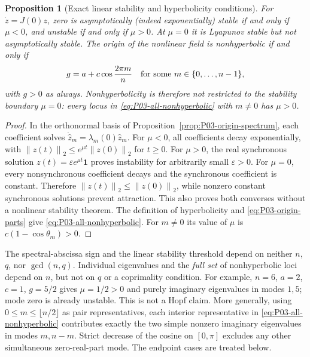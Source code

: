 \documentclass[11pt]{article}
\newcommand{\one}{\mathbf{1}}
\newcommand{\norm}[1]{\left\lVert #1\right\rVert}
\newtheorem{proposition}[theorem]{Proposition}
\theoremstyle{definition}
\theoremstyle{remark}
\begin{document}
\begin{proposition}[Exact linear stability and hyperbolicity conditions]
\label{prop:P03-stability}
For $\dot z=J(0)z$, zero is asymptotically (indeed exponentially)
stable if and only if $\mu<0$, and unstable if and only if $\mu>0$.
At $\mu=0$ it is Lyapunov stable but not asymptotically stable.
The origin of the nonlinear field is nonhyperbolic if and only if
\begin{equation}
 g=a+c\cos\frac{2\pi m}{n}
 \quad\hbox{for some }m\in\{0,\ldots,n-1\},
 \label{eq:P03-all-nonhyperbolic}
\end{equation}
with $g>0$ as always. Nonhyperbolicity is therefore not restricted
to the stability boundary $\mu=0$: every locus in
\eqref{eq:P03-all-nonhyperbolic} with $m\ne0$ has $\mu>0$.
\end{proposition}
\begin{proof}
In the orthonormal basis of Proposition~\ref{prop:P03-origin-spectrum},
each coefficient solves $\dot{\widehat z}_m=\lambda_m(0)\widehat z_m$.
For $\mu<0$, all coefficients decay exponentially, with
$\norm{z(t)}_2\le e^{\mu t}\norm{z(0)}_2$ for $t\ge0$.
For $\mu>0$, the real synchronous solution
$z(t)=\varepsilon e^{\mu t}\one$ proves instability for arbitrarily
small $\varepsilon>0$. For $\mu=0$, every nonsynchronous coefficient
 decays and the synchronous coefficient is constant. Therefore
$\norm{z(t)}_2\le\norm{z(0)}_2$, while nonzero constant synchronous
solutions prevent attraction. This also proves both converses
without a nonlinear stability theorem. The definition of hyperbolicity
and \eqref{eq:P03-origin-parts} give
\eqref{eq:P03-all-nonhyperbolic}. For $m\ne0$ its value of
$\mu$ is $c(1-\cos\theta_m)>0$.
\end{proof}

The spectral-abscissa sign and the linear stability threshold depend
on neither $n$, $q$, nor $\gcd(n,q)$. Individual eigenvalues and the
\emph{full set} of nonhyperbolic loci depend on $n$, but not on $q$
or a coprimality condition. For example, $n=6$, $a=2$, $c=1$,
$g=5/2$ gives $\mu=1/2>0$ and purely imaginary eigenvalues in
modes $1,5$; mode zero is already unstable. This is not a Hopf claim.
More generally, using $0\le m\le\lfloor n/2\rfloor$ as pair
representatives, each interior representative in
\eqref{eq:P03-all-nonhyperbolic} contributes exactly the two
simple nonzero imaginary eigenvalues in modes $m,n-m$.
Strict decrease of the cosine on $[0,\pi]$ excludes any other
simultaneous zero-real-part mode. The endpoint cases are treated below.
\end{document}
